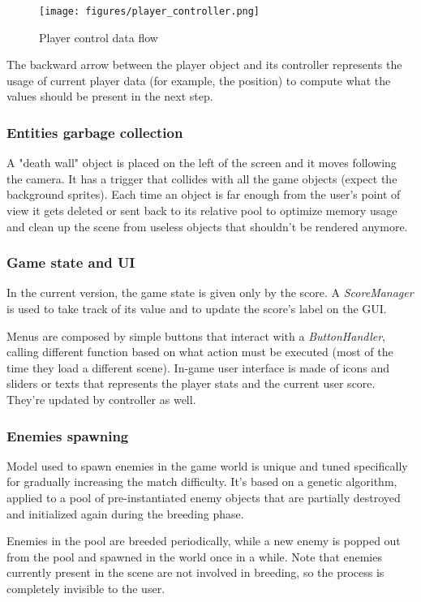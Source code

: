 \documentclass[11pt]{article}
\begin{document}
\begin{figure}[H]
  \centering
  \texttt{[image: figures/player\_controller.png]}
  \caption{Player control data flow}
\end{figure}

The backward arrow between the player object and its controller represents the usage of current player data (for example, the position) to compute what the values should be present in the next step.

\subsubsection{Entities garbage collection}
A "death wall" object is placed on the left of the screen and it moves following the camera. It has a trigger that collides with all the game objects (expect the background sprites). Each time an object is far enough from the user's point of view it gets deleted or sent back to its relative pool to optimize memory usage and clean up the scene from useless objects that shouldn't be rendered anymore.

\subsubsection{Game state and UI}
In the current version, the game state is given only by the score. A \textit{ScoreManager} is used to take track of its value and to update the score's label on the GUI.

Menus are composed by simple buttons that interact with a \textit{ButtonHandler}, calling different function based on what action must be executed (most of the time they load a different scene).
In-game user interface is made of icons and sliders or texts that represents the player stats and the current user score. They're updated by controller as well.

\subsubsection{Enemies spawning}
Model used to spawn enemies in the game world is unique and tuned specifically for gradually increasing the match difficulty.
It's based on a genetic algorithm, applied to a pool of pre-instantiated enemy objects that are partially destroyed and initialized again during the breeding phase.

Enemies in the pool are breeded periodically, while a new enemy is popped out from the pool and spawned in the world once in a while. Note that enemies currently present in the scene are not involved in breeding, so the process is completely invisible to the user.
\end{document}
